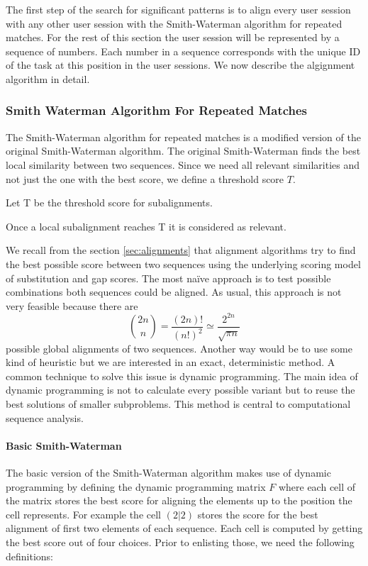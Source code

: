 The first step of the search for significant patterns is to align every user session with any other user session with the Smith-Waterman algorithm for repeated matches.
For the rest of this section the user session will be represented by a sequence of numbers. Each number in a sequence corresponds with the unique ID of the task at this position in the user sessions.
We now describe the algignment algorithm in detail.

\subsubsection{Smith Waterman Algorithm For Repeated Matches}
The Smith-Waterman algorithm for repeated matches\cite{durbin1998} is a modified version of the original Smith-Waterman algorithm\cite{waterman1981}.
The original Smith-Waterman finds the best local similarity between two sequences.
Since we need all relevant similarities and not just the one with the best score, we define a threshold score $T$.
\begin{definition}
	Let T be the threshold score for subalignments.
	\label{def:treshold}
\end{definition}
Once a local subalignment reaches T it is considered as relevant.

We recall from the section \ref{sec:alignments} that alignment algorithms try to find the best possible score between two sequences using the underlying scoring model of substitution and gap scores.
The most na\"ive approach is to test possible combinations both sequences could be aligned. As usual, this approach is not very feasible because there are
\begin{equation*}
	\binom{2n}{n} = \frac{(2n)!}{(n!)^2} \simeq \frac{2^{2n}}{\sqrt{\pi n}}
\end{equation*}
possible global alignments of two sequences\cite{durbin1998}.
Another way would be to use some kind of heuristic but we are interested in an exact, deterministic method.
A common technique to solve this issue is dynamic programming\cite{bellman1957}.
The main idea of dynamic programming is not to calculate every possible variant but to reuse the best solutions of smaller subproblems.
This method is central to computational sequence analysis\cite{durbin1998}.

\paragraph{Basic Smith-Waterman}
The basic version of the Smith-Waterman algorithm makes use of dynamic programming by defining the dynamic programming matrix $F$ where each cell of the matrix stores the best score for aligning the elements up to the position the cell represents.
For example the cell $(2|2)$ stores the score for the best alignment of first two elements of each sequence.
Each cell is computed by getting the best score out of four choices. Prior to enlisting those, we need the following definitions:

